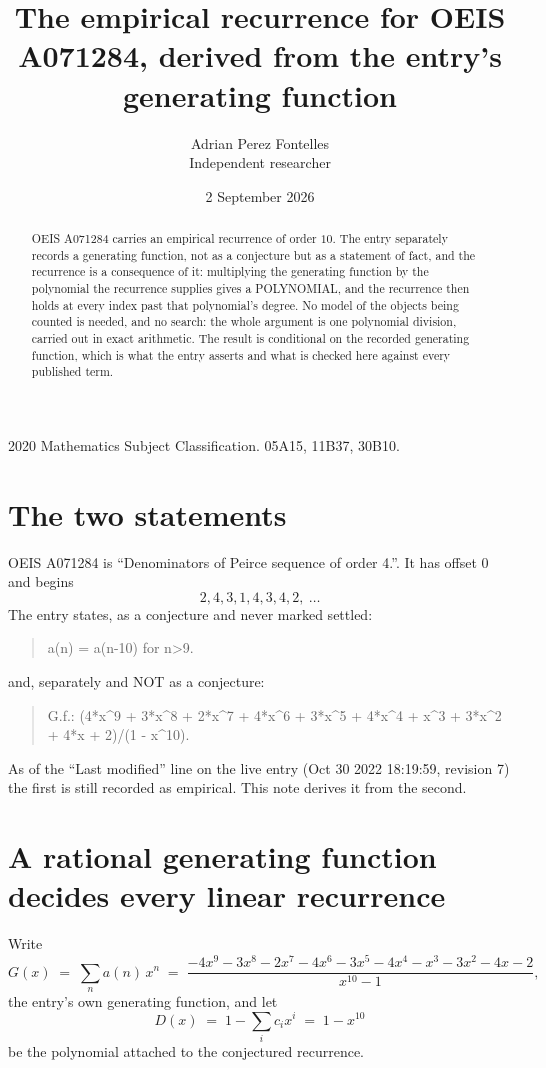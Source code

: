 \documentclass[11pt,a4paper]{article}
\title{The empirical recurrence for OEIS A071284, derived from the entry's generating function}
\author{Adrian Perez Fontelles\\ \small Independent researcher}
\date{2 September 2026}
\theoremstyle{plain}
\theoremstyle{definition}
\begin{document}
\maketitle

\begin{abstract}
OEIS A071284 carries an empirical recurrence of order $10$. The entry separately records a
generating function, not as a conjecture but as a statement of fact, and the recurrence is a
consequence of it: multiplying the generating function by the polynomial the recurrence
supplies gives a POLYNOMIAL, and the recurrence then holds at every index past that
polynomial's degree. No model of the objects being counted is needed, and no search: the
whole argument is one polynomial division, carried out in exact arithmetic. The result is
conditional on the recorded generating function, which is what the entry asserts and what is
checked here against every published term.
\end{abstract}

\noindent\small 2020 Mathematics Subject Classification. 05A15, 11B37, 30B10.\normalsize

\section{The two statements}

OEIS A071284 is ``Denominators of Peirce sequence of order 4.''. It has offset $0$ and begins
\[
2, 4, 3, 1, 4, 3, 4, 2,\ \dots
\]
The entry states, as a conjecture and never marked settled:
\begin{quote}
a(n) = a(n-10) for n>9.
\end{quote}
and, separately and NOT as a conjecture:
\begin{quote}
G.f.: (4*x\^{}9 + 3*x\^{}8 + 2*x\^{}7 + 4*x\^{}6 + 3*x\^{}5 + 4*x\^{}4 + x\^{}3 + 3*x\^{}2 + 4*x + 2)/(1 - x\^{}10).
\end{quote}
As of the ``Last modified'' line on the live entry (Oct 30 2022 18:19:59, revision 7) the first is still
recorded as empirical. This note derives it from the second.

\section{A rational generating function decides every linear recurrence}

Write
\[
G(x)\;=\;\sum_{n}a(n)\,x^{n}\;=\;\frac{- 4 x^{9} - 3 x^{8} - 2 x^{7} - 4 x^{6} - 3 x^{5} - 4 x^{4} - x^{3} - 3 x^{2} - 4 x - 2}{x^{10} - 1},
\]
the entry's own generating function, and let
\[
D(x)\;=\;1-\sum_i c_i x^{i}\;=\;1 - x^{10}
\]
be the polynomial attached to the conjectured recurrence.
\end{document}
